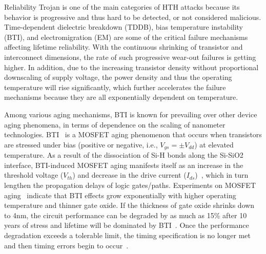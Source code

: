 Reliability Trojan is one of the main categories of HTH attacks because its behavior is progressive and thus hard to be detected, or not considered malicious. Time-dependent dielectric breakdown (TDDB), bias temperature instability (BTI), and electromigration (EM) are some of the critical failure mechanisms affecting lifetime reliability. With the continuous shrinking of transistor and interconnect dimensions, the rate of such progressive wear-out failures is getting higher. In addition, due to the increasing transistor density without proportional downscaling of supply voltage, the power density and thus the operating temperature will rise significantly, which further accelerates the failure mechanisms because they are all exponentially dependent on temperature. 

Among various aging mechanisms, BTI is known for prevailing over other device aging phenomena, in terms of dependence on the scaling of nanometer technologies. BTI~\cite{schroder2003negative} is a MOSFET aging phenomenon that occurs when transistors are stressed under bias (positive or negative, i.e., $V_{gs} = \pm V_{dd}$) at elevated temperature. As a result of the dissociation of Si-H bonds along the Si-SiO2 interface, BTI-induced MOSFET aging manifests itself as an increase in the threshold voltage ($V_{th}$) and decrease in the drive current ($I_{ds}$)~\cite{zafar2006negative}, which in turn lengthen the propagation delays of logic gates/paths. Experiments on MOSFET aging~\cite{chakravarthi2004comprehensive} indicate that BTI effects grow exponentially with higher operating temperature and thinner gate oxide. If the thickness of gate oxide shrinks down to 4nm, the circuit performance can be degraded by as much as 15\% after 10 years of stress and lifetime will be dominated by BTI~\cite{kimizuka1999impact}. Once the performance degradation exceeds a tolerable limit, the timing specification is no longer met and then timing errors begin to occur~\cite{kumar2006analytical}\cite{wang2010impact}.

